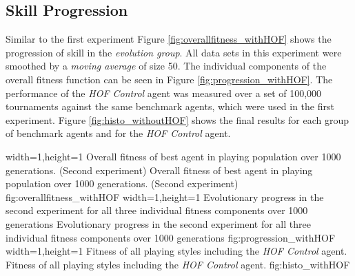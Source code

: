 \subsection{Skill Progression}
Similar to the first experiment Figure \ref{fig:overallfitness_withHOF} shows the progression of skill in the \textit{evolution group}. All data sets in this experiment were smoothed by a \textit{moving average} of size 50. The individual components of the overall fitness function can be seen in Figure \ref{fig:progression_withHOF}. The performance of the \textit{HOF Control} agent was measured over a set of 100,000 tournaments against the same benchmark agents, which were used in the first experiment. Figure \ref{fig:histo_withoutHOF} shows the final results for each group of benchmark agents and for the \textit{HOF Control} agent.\par
{}%
  {width=1\textwidth,height=1\textheight}%
  {Overall fitness of best agent in playing population over 1000 generations. (Second experiment)}%
  {Overall fitness of best agent in playing population over 1000 generations. (Second experiment)}%
  {fig:overallfitness_withHOF}%
  {width=1\textwidth,height=1\textheight}%
  {Evolutionary progress in the second experiment for all three individual fitness components over 1000 generations}%
  {Evolutionary progress in the second experiment for all three individual fitness components over 1000 generations}%
  {fig:progression_withHOF}%
  {width=1\textwidth,height=1\textheight}%
  {Fitness of all playing styles including the \textit{HOF Control} agent.}%
  {Fitness of all playing styles including the \textit{HOF Control} agent.}%
  {fig:histo_withHOF}%
